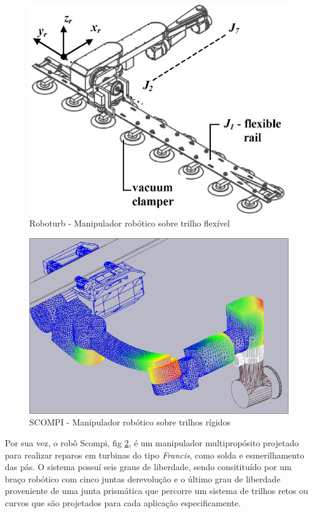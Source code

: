     \begin{figure}[h!]	
		\includegraphics[width=\columnwidth]{figs/trilhos/roboturbpaper}
		\caption{Roboturb - Manipulador robótico sobre trilho flexível}
		\label{fig::roboturb}
	\end{figure}
	\begin{figure}[h!]
		\includegraphics[width=\columnwidth]{figs/trilhos/scompi}
		\caption{SCOMPI - Manipulador robótico sobre trilhos rígidos}
		\label{fig::scompi}
	\end{figure}

Por sua vez, o robô Scompi, fig \ref{fig::scompi}, é um manipulador
multipropósito projetado para realizar reparos em turbinas do tipo \textit{Francis},
 como solda e esmerilhamento das pás. O sistema possuí seis graus de liberdade, sendo 
consitituído por um braço robótico com cinco juntas derevolução e o último grau
 de liberdade proveniente de uma junta prismática que percorre um sistema de 
 trilhos retos ou curvos que são projetados para cada aplicação especificamente. 


